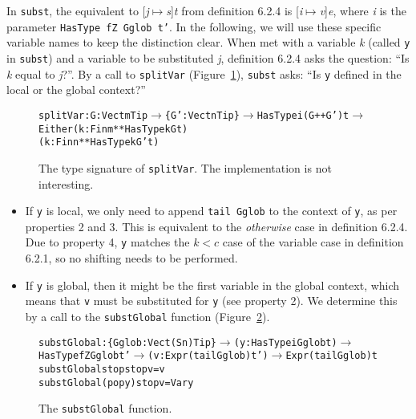 In \texttt{subst}, the equivalent to [\textit{j}$\mapsto$\textit{s}]\textit{t} from definition 6.2.4 is [\textit{i}$\mapsto$\textit{v}]\textit{e}, where \textit{i} is the parameter \texttt{HasType fZ Gglob t'}. In the following, we will use these specific variable names to keep the distinction clear. When met with a variable \textit{k} (called \texttt{y} in \texttt{subst}) and a variable to be substituted \textit{j}, definition 6.2.4 asks the question: ``Is \textit{k} equal to \textit{j}?''. By a call to \texttt{splitVar} (Figure~\ref{fig:splitVar}), \texttt{subst} asks: ``Is \texttt{y} defined in the local or the global context?''

\begin{figure}
\begin{alltt}
splitVar : {G: Vect m Tip} \(\rightarrow\) \{G': Vect n Tip\} \(\rightarrow\) HasType i (G ++ G') t \(\rightarrow\)
           Either (k: Fin m ** HasType k G t) 
                  (k: Fin n ** HasType k G' t)
\end{alltt}
\caption{The type signature of \texttt{splitVar}. The implementation is not interesting.}
\label{fig:splitVar}
\end{figure}

\begin{itemize}
\item If \texttt{y} is local, we only need to append \texttt{tail Gglob} to the context of \texttt{y}, as per properties 2 and 3. This is equivalent to the \textit{otherwise} case in definition 6.2.4. Due to property 4, \texttt{y} matches the $k < c$ case of the variable case in definition 6.2.1, so no shifting needs to be performed.
\item If \texttt{y} is global, then it might be the first variable in the global context, which means that \texttt{v} must be substituted for \texttt{y} (see property 2). We determine this by a call to the \texttt{substGlobal} function (Figure~\ref{fig:substGlobal}).
\end{itemize}

\begin{figure}
\begin{alltt}
    substGlobal : \{Gglob : Vect (S n) Tip\} \(\rightarrow\) (y: HasType i Gglob t) \(\rightarrow\) 
                  HasType fZ Gglob t' \(\rightarrow\) (v: Expr (tail Gglob) t') \(\rightarrow\) Expr (tail Gglob) t
    substGlobal stop    stop v = v
    substGlobal (pop y) stop v = Var y
\end{alltt}
\caption{The \texttt{substGlobal} function.}
\label{fig:substGlobal}
\end{figure}


